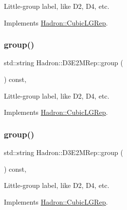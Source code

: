 Little-\/group label, like D2, D4, etc. 

Implements \mbox{\hyperlink{structHadron_1_1CubicLGRep_a9bdb14b519a611d21379ed96a3a9eb41}{Hadron\+::\+Cubic\+L\+G\+Rep}}.

\mbox{\label{structHadron_1_1D3E2MRep_a16828fce715dd1dea202c71b41476ff2}} 
\subsubsection{\texorpdfstring{group()}{group()}\hspace{0.1cm}{\footnotesize\ttfamily [2/3]}}
{\footnotesize\ttfamily std\+::string Hadron\+::\+D3\+E2\+M\+Rep\+::group (\begin{DoxyParamCaption}{ }\end{DoxyParamCaption}) const\hspace{0.3cm}{\ttfamily [inline]}, {\ttfamily [virtual]}}

Little-\/group label, like D2, D4, etc. 

Implements \mbox{\hyperlink{structHadron_1_1CubicLGRep_a9bdb14b519a611d21379ed96a3a9eb41}{Hadron\+::\+Cubic\+L\+G\+Rep}}.

\mbox{\label{structHadron_1_1D3E2MRep_a16828fce715dd1dea202c71b41476ff2}} 
\subsubsection{\texorpdfstring{group()}{group()}\hspace{0.1cm}{\footnotesize\ttfamily [3/3]}}
{\footnotesize\ttfamily std\+::string Hadron\+::\+D3\+E2\+M\+Rep\+::group (\begin{DoxyParamCaption}{ }\end{DoxyParamCaption}) const\hspace{0.3cm}{\ttfamily [inline]}, {\ttfamily [virtual]}}

Little-\/group label, like D2, D4, etc. 

Implements \mbox{\hyperlink{structHadron_1_1CubicLGRep_a9bdb14b519a611d21379ed96a3a9eb41}{Hadron\+::\+Cubic\+L\+G\+Rep}}.

\mbox{\label{structHadron_1_1D3E2MRep_aa19ff7cb3edd937564ed3bbb3c9fe36b}} 

